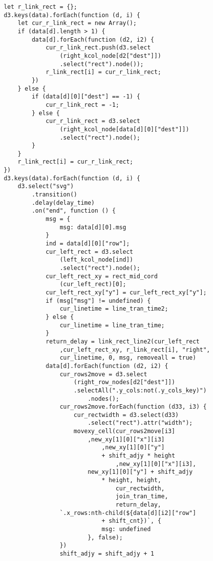 \begin{lstlisting}
    let r_link_rect = {};
    d3.keys(data).forEach(function (d, i) {
        let cur_r_link_rect = new Array();
        if (data[d].length > 1) {
            data[d].forEach(function (d2, i2) {
                cur_r_link_rect.push(d3.select
                    (right_kcol_node[d2["dest"]])
                    .select("rect").node());
                r_link_rect[i] = cur_r_link_rect;
            })
        } else {
            if (data[d][0]["dest"] == -1) {
                cur_r_link_rect = -1;
            } else {
                cur_r_link_rect = d3.select
                    (right_kcol_node[data[d][0]["dest"]])
                    .select("rect").node();
            }
        }
        r_link_rect[i] = cur_r_link_rect;
    })
    d3.keys(data).forEach(function (d, i) {
        d3.select("svg")
            .transition()
            .delay(delay_time)
            .on("end", function () {
                msg = {
                    msg: data[d][0].msg
                }
                ind = data[d][0]["row"];
                cur_left_rect = d3.select
                    (left_kcol_node[ind])
                    .select("rect").node();
                cur_left_rect_xy = rect_mid_cord
                    (cur_left_rect)[0];
                cur_left_rect_xy["y"] = cur_left_rect_xy["y"];
                if (msg["msg"] != undefined) {
                    cur_linetime = line_tran_time2;
                } else {
                    cur_linetime = line_tran_time;
                }
                return_delay = link_rect_line2(cur_left_rect
                    ,cur_left_rect_xy, r_link_rect[i], "right",
                    cur_linetime, 0, msg, removeall = true)
                data[d].forEach(function (d2, i2) {
                    cur_rows2move = d3.select
                        (right_row_nodes[d2["dest"]])
                        .selectAll(".y_cols:not(.y_cols_key)")
                            .nodes();
                    cur_rows2move.forEach(function (d33, i3) {
                        cur_rectwidth = d3.select(d33)
                            .select("rect").attr("width");
                        movexy_cell(cur_rows2move[i3]
                            ,new_xy[1][0]["x"][i3]
                                ,new_xy[1][0]["y"]
                                + shift_adjy * height
                                    ,new_xy[1][0]["x"][i3],
                            new_xy[1][0]["y"] + shift_adjy 
                                * height, height, 
                                    cur_rectwidth, 
                                    join_tran_time, 
                                    return_delay,
                    `.x_rows:nth-child(${data[d][i2]["row"]
                                + shift_cnt})`, {
                                msg: undefined
                            }, false);
                    })
                    shift_adjy = shift_adjy + 1


\end{lstlisting}
